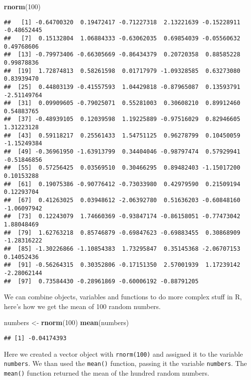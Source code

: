\documentclass[
]{book}
\newenvironment{Shaded}{\begin{snugshade}}{\end{snugshade}}
\newcommand{\DecValTok}[1]{\textcolor[rgb]{0.00,0.00,0.81}{#1}}
\newcommand{\KeywordTok}[1]{\textcolor[rgb]{0.13,0.29,0.53}{\textbf{#1}}}
\newcommand{\NormalTok}[1]{#1}
\newcommand{\StringTok}[1]{\textcolor[rgb]{0.31,0.60,0.02}{#1}}
\begin{document}
\begin{Shaded}
\begin{Highlighting}[]
\KeywordTok{rnorm}\NormalTok{(}\DecValTok{100}\NormalTok{)}
\end{Highlighting}
\end{Shaded}

\begin{verbatim}
##   [1] -0.64700320  0.19472417 -0.71227318  2.13221639 -0.15228911 -0.48652445
##   [7]  0.15132804  1.06884333 -0.63062035  0.69854039 -0.05560632  0.49768606
##  [13] -0.79973406 -0.66305669 -0.86434379  0.20720358  0.88585228  0.99878836
##  [19]  1.72874813  0.58261598  0.01717979 -1.09328585  0.63273080  0.83939470
##  [25]  0.44803139 -0.41557593  1.04429818 -0.87965087  0.13593791 -2.51149764
##  [31]  0.09909605 -0.79025071  0.55281003  0.30608210  0.89912460  0.54883765
##  [37] -0.48939105  0.12039598  1.19225889 -0.97516029  0.82946605  1.31223128
##  [43]  0.59118217  0.25561433  1.54751125  0.96278799  0.10450059 -1.15249384
##  [49] -0.36961950 -1.63913799  0.34404046 -0.98797474  0.57929941 -0.51846856
##  [55]  0.57256425  0.03569510  0.30466295  0.89482403 -1.15017200  0.10153288
##  [61]  0.19075386 -0.90776412 -0.73033980  0.42979590  0.21509194  0.12293704
##  [67]  0.41263025  0.03948612 -2.06392780  0.51636203 -0.60848160 -1.06097942
##  [73]  0.12243079  1.74660369 -0.93847174 -0.86158051 -0.77473042  1.88048469
##  [79]  1.62763218  0.85746879 -0.69847623 -0.69883455  0.30868909 -1.28316222
##  [85] -1.30226866 -1.10854383  1.73295847  0.35145368 -2.06707153  0.14052436
##  [91] -0.56264315  0.30352806 -0.17151350  2.57001939  1.17239142 -2.28062144
##  [97]  0.73584430 -0.28961869 -0.60006192 -0.88791205
\end{verbatim}

We can combine objects, variables and functions to do more complex stuff in R, here's how we get the mean of 100 random numbers.

\begin{Shaded}
\begin{Highlighting}[]
\NormalTok{numbers <-}\StringTok{ }\KeywordTok{rnorm}\NormalTok{(}\DecValTok{100}\NormalTok{)}
\KeywordTok{mean}\NormalTok{(numbers)}
\end{Highlighting}
\end{Shaded}

\begin{verbatim}
## [1] -0.04174393
\end{verbatim}

Here we created a vector object with \texttt{rnorm(100)} and assigned it to the variable \texttt{numbers}. We than used the \texttt{mean()} function, passing it the variable \texttt{numbers}. The \texttt{mean()} function returned the mean of the hundred random numbers.
\end{document}
